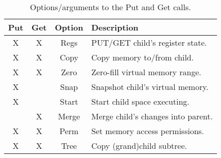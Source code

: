 
\begin{table}[t]
\begin{tabular}{c | c | c | l}
Put & Get & Option & Description \\
\hline
X & X & Regs & PUT/GET child’s register state. \\
X & X & Copy & Copy memory to/from child. \\
X & X & Zero & Zero-fill virtual memory range. \\
X &  & Snap & Snapshot child’s virtual memory. \\
X &  & Start & Start child space executing. \\
 & X & Merge & Merge child’s changes into parent. \\
X & X & Perm & Set memory access permissions. \\
X & X & Tree & Copy (grand)child subtree. \\
\end{tabular}
\caption{Options/arguments to the Put and Get calls.}
\label{tab:options}
\end{table}

\endinput

